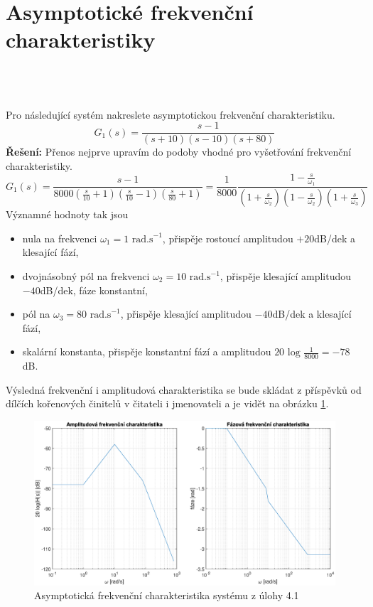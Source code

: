 \documentclass[twoside]{article}
\begin{document}
\section{Asymptotické frekvenční charakteristiky}
\label{sec:ukol4}

\subsection{~}
Pro následující systém nakreslete asymptotickou frekvenční charakteristiku.
\begin{equation}
	G_1(s) = \frac{s-1}{(s+10)(s-10)(s+80)}
\end{equation}
\textbf{Řešení:} Přenos nejprve upravím do podoby vhodné pro vyšetřování frekvenční charakteristiky.
\begin{equation*}
	G_1(s) = \frac{s-1}{8000(\frac{s}{10}+1)(\frac{s}{10}-1)(\frac{s}{80}+1)} = \frac{1}{8000} \frac{1-\frac{s}{\omega_1}}{(1+\frac{s}{\omega_2})(1-\frac{s}{\omega_2})(1+\frac{s}{\omega_3})}
\end{equation*}
Významné hodnoty tak jsou
\begin{itemize}
	\item nula na frekvenci $\omega_1 = 1 \text{ rad.s}^{-1}$, přispěje rostoucí amplitudou $+20$dB/dek a klesající fází,
	\item dvojnásobný pól na frekvenci $\omega_2 = 10 \text{ rad.s}^{-1}$, přispěje klesající amplitudou $-40$dB/dek, fáze konstantní,
	\item pól na $\omega_3 = 80 \text{ rad.s}^{-1}$, přispěje klesající amplitudou $-40$dB/dek a klesající fází,
	\item skalární konstanta, přispěje konstantní fází a amplitudou $20 \text{ log }\frac{1}{8000} = -78$ dB.
\end{itemize}
Výsledná frekvenční i amplitudová charakteristika se bude skládat z příspěvků od dílčích kořenových činitelů v čitateli i jmenovateli a je vidět na obrázku \ref{fig:frekchar_bode}.
\begin{figure}[htbp]
    \centering %
	\includegraphics[width=\linewidth]{frekchar.eps}
\caption{Asymptotická frekvenční charakteristika systému z úlohy 4.1}
\label{fig:frekchar_bode}
\end{figure}
\end{document}
